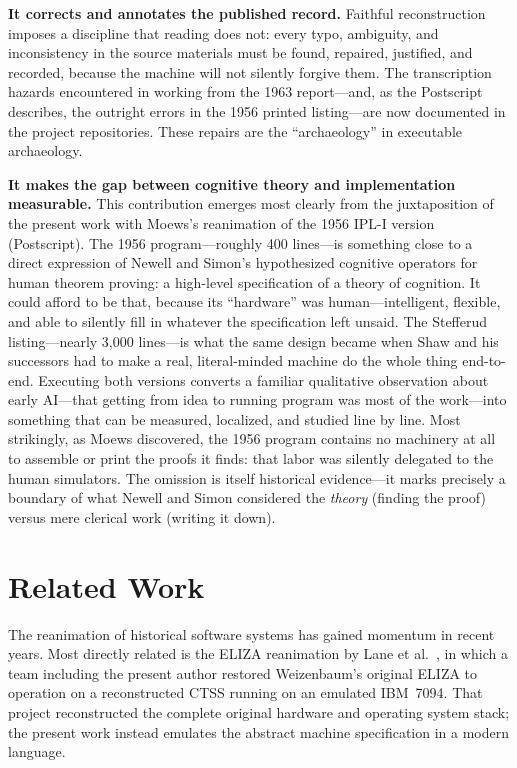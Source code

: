 \documentclass[journal]{IEEEtran}
\begin{document}
\textbf{It corrects and annotates the published record.} Faithful
reconstruction imposes a discipline that reading does not: every typo,
ambiguity, and inconsistency in the source materials must be found,
repaired, justified, and recorded, because the machine will not
silently forgive them. The transcription hazards encountered in
working from the 1963 report---and, as the Postscript describes, the
outright errors in the 1956 printed listing---are now documented in
the project repositories. These repairs are the ``archaeology'' in
executable archaeology.

\textbf{It makes the gap between cognitive theory and implementation
measurable.} This contribution emerges most clearly from the
juxtaposition of the present work with Moews's reanimation of the
1956 IPL-I version (Postscript). The 1956 program---roughly 400
lines---is something close to a direct expression of Newell and
Simon's hypothesized cognitive operators for human theorem proving: a
high-level specification of a theory of cognition. It could afford to
be that, because its ``hardware'' was human---intelligent, flexible,
and able to silently fill in whatever the specification left
unsaid. The Stefferud listing---nearly 3,000 lines---is what the same
design became when Shaw and his successors had to make a real,
literal-minded machine do the whole thing end-to-end. Executing both
versions converts a familiar qualitative observation about early
AI---that getting from idea to running program was most of the
work---into something that can be measured, localized, and studied
line by line. Most strikingly, as Moews discovered, the 1956 program
contains no machinery at all to assemble or print the proofs it
finds: that labor was silently delegated to the human simulators. The
omission is itself historical evidence---it marks precisely a
boundary of what Newell and Simon considered the \emph{theory}
(finding the proof) versus mere clerical work (writing it down).

\section{Related Work}
\label{sec:related}

The reanimation of historical software systems has gained momentum in
recent years. Most directly related is the ELIZA reanimation by Lane
et al.~\cite{lane2025eliza}, in which a team including the present
author restored Weizenbaum's original ELIZA to operation on a
reconstructed CTSS running on an emulated IBM~7094. That project
reconstructed the complete original hardware and operating system
stack; the present work instead emulates the abstract machine
specification in a modern language.
\end{document}
